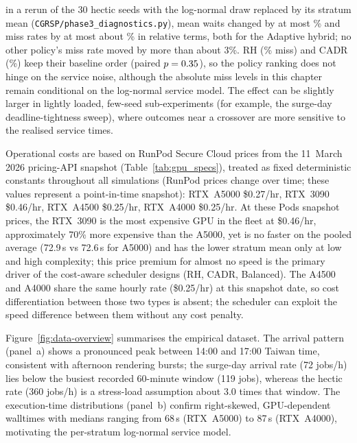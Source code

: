 {in a rerun of the 30 hectic seeds with the log-normal draw replaced by its stratum mean (\texttt{CGRSP/phase3\_diagnostics.py}), mean waits changed by at most \MeanSvcWaitMaxPct\% and miss rates by at most about \MeanSvcMissMaxRelPct\% in relative terms, both for the Adaptive hybrid; no other policy's miss rate moved by more than about 3\%. RH (\MeanSvcRHMiss\% miss) and CADR (\MeanSvcCADRMiss\%) keep their baseline order (paired $p=0.35$), so the policy ranking does not hinge on the service noise, although the absolute miss levels in this chapter remain conditional on the log-normal service model. The effect can be slightly larger in lightly loaded, few-seed sub-experiments (for example, the surge-day deadline-tightness sweep), where outcomes near a crossover are more sensitive to the realised service times.

Operational costs are based on RunPod Secure Cloud prices from the 11~March 2026 pricing-API snapshot (Table~\ref{tab:gpu_specs}), treated as fixed deterministic constants throughout all simulations (RunPod prices change over time; these values represent a point-in-time snapshot): RTX~A5000 \$0.27/hr, RTX~3090 \$0.46/hr, RTX~A4500 \$0.25/hr, RTX~A4000 \$0.25/hr. At these Pods snapshot prices, the RTX~3090 is the most expensive GPU in the fleet at \$0.46/hr, approximately 70\% more expensive than the A5000, yet is no faster on the pooled average (72.9\,s vs 72.6\,s for A5000) and has the lower stratum mean only at low and high complexity; this price premium for almost no speed is the primary driver of the cost-aware scheduler designs (RH, CADR, Balanced). The A4500 and A4000 share the same hourly rate (\$0.25/hr) at this snapshot date, so cost differentiation between those two types is absent; the scheduler can exploit the speed difference between them without any cost penalty.

Figure~\ref{fig:data-overview} summarises the empirical dataset. The arrival pattern (panel~a) shows a pronounced peak between 14:00 and 17:00 Taiwan time, consistent with afternoon rendering bursts; the surge-day arrival rate (72 jobs/h) lies below the busiest recorded 60-minute window (119 jobs), whereas the hectic rate (360 jobs/h) is a stress-load assumption about 3.0 times that window. The execution-time distributions (panel~b) confirm right-skewed, GPU-dependent walltimes with medians ranging from 68\,s (RTX~A5000) to 87\,s (RTX~A4000), motivating the per-stratum log-normal service model.

}
